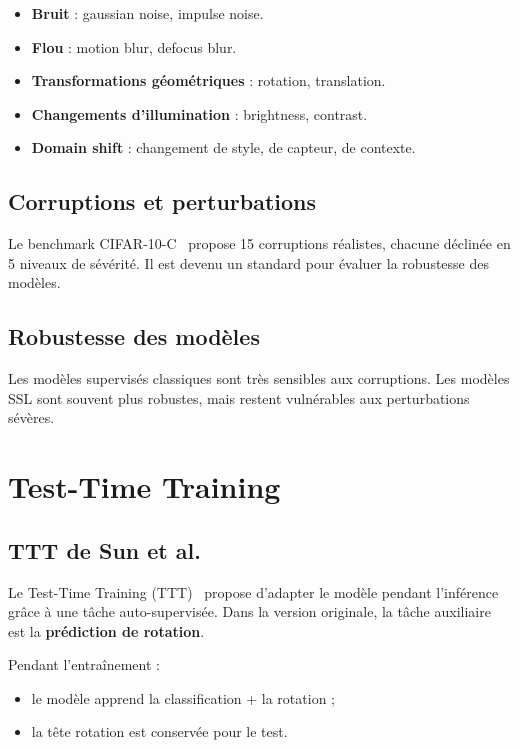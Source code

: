 \documentclass[12pt,a4paper]{report}
\begin{document}
	\begin{itemize}
		\item \textbf{Bruit} : gaussian noise, impulse noise.
		\item \textbf{Flou} : motion blur, defocus blur.
		\item \textbf{Transformations géométriques} : rotation, translation.
		\item \textbf{Changements d’illumination} : brightness, contrast.
		\item \textbf{Domain shift} : changement de style, de capteur, de contexte.
	\end{itemize}
	
	\subsection{Corruptions et perturbations}
	
	Le benchmark CIFAR-10-C~\cite{Hendrycks2019} propose 15 corruptions réalistes, chacune déclinée en 5 niveaux de sévérité.  
	Il est devenu un standard pour évaluer la robustesse des modèles.
	
	\subsection{Robustesse des modèles}
	
	Les modèles supervisés classiques sont très sensibles aux corruptions.  
	Les modèles SSL sont souvent plus robustes, mais restent vulnérables aux perturbations sévères.
	
	\section{Test-Time Training}
	
	\subsection{TTT de Sun et al.}
	
	Le Test-Time Training (TTT)~\cite{Sun2020} propose d’adapter le modèle pendant l’inférence grâce à une tâche auto-supervisée.  
	Dans la version originale, la tâche auxiliaire est la \textbf{prédiction de rotation}.
	
	Pendant l’entraînement :
	\begin{itemize}
		\item le modèle apprend la classification + la rotation ;
		\item la tête rotation est conservée pour le test.
	\end{itemize}
	
\end{document}

